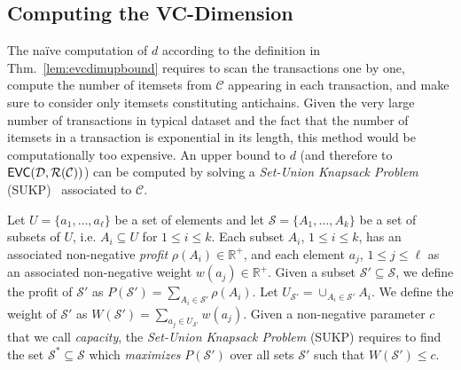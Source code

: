 \subsection{Computing the VC-Dimension}\label{sec:computvc}
The na\"ive computation of $d$  according to the definition in Thm.~\ref{lem:evcdimupbound}
requires to scan the transactions one by one, 
compute the number of itemsets from $\mathcal{C}$ appearing in each
transaction, and make sure to consider only itemsets constituting antichains. Given the very large
number of transactions in typical dataset and the fact that the number of
itemsets in a transaction is exponential in its length, this method would be
computationally too expensive. An upper bound to $d$ (and therefore to
$\mathsf{EVC}({\cal D},\mathcal{R}(\mathcal{C}))$) can be computed by solving a
\emph{Set-Union Knapsack Problem} (SUKP)~\citep{GoldschmidtNY94} associated to
$\mathcal{C}$.

\begin{definition}\label{def:sukp}
  Let $U=\{a_1,\dotsc,a_\ell\}$ be a set of elements and let
  $\mathcal{S}=\{A_1,\dotsc,A_k\}$ be a set of subsets of $U$, i.e.
  $A_i\subseteq U$ for $1\le i\le k$. Each subset $A_i$, $1\le i\le k$, has an associated
  non-negative \emph{profit} $\rho(A_i)\in\mathbb{R}^+$, and each element $a_j$, $1\le
  j\le\ell$ as an associated non-negative weight $w(a_j)\in\mathbb{R}^+$.
  Given a subset $\mathcal{S}'\subseteq\mathcal{S}$, we define the profit of
  $\mathcal{S}'$ as $P(\mathcal{S}')=\sum_{A_i\in \mathcal{S}'}\rho(A_i)$. Let
  $U_{\mathcal{S}'}=\cup_{A_i\in\mathcal{S}'} A_i$. We
  define the weight of $\mathcal{S}'$ as $W(\mathcal{S}')=\sum_{a_j\in
  U_{\mathcal{S}'}} w(a_j)$. Given a non-negative parameter $c$ that we call
  \emph{capacity}, the \emph{Set-Union Knapsack Problem} (SUKP) requires to find
  the set $\mathcal{S}^*\subseteq\mathcal{S}$ which \emph{maximizes}
  $P(\mathcal{S}')$ over all sets $\mathcal{S}'$ such that $W(\mathcal{S}')\le c$.
\end{definition}

